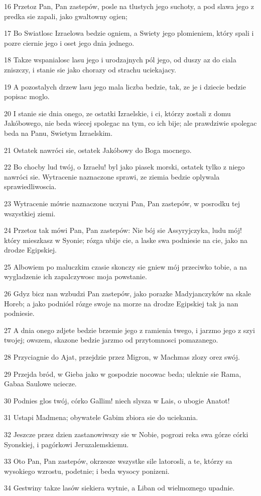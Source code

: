 \par 16 Przetoz Pan, Pan zastepów, posle na tlustych jego suchoty, a pod slawa jego z predka sie zapali, jako gwaltowny ogien;
\par 17 Bo Swiatlosc Izraelowa bedzie ogniem, a Swiety jego plomieniem, który spali i pozre ciernie jego i oset jego dnia jednego.
\par 18 Takze wspanialosc lasu jego i urodzajnych pól jego, od duszy az do ciala zniszczy, i stanie sie jako chorazy od strachu uciekajacy.
\par 19 A pozostalych drzew lasu jego mala liczba bedzie, tak, ze je i dziecie bedzie popisac moglo.
\par 20 I stanie sie dnia onego, ze ostatki Izraelskie, i ci, którzy zostali z domu Jakóbowego, nie beda wiecej spolegac na tym, co ich bije; ale prawdziwie spolegac beda na Panu, Swietym Izraelskim.
\par 21 Ostatek nawróci sie, ostatek Jakóbowy do Boga mocnego.
\par 22 Bo chocby lud twój, o Izraelu! byl jako piasek morski, ostatek tylko z niego nawróci sie. Wytracenie naznaczone sprawi, ze ziemia bedzie oplywala sprawiedliwoscia.
\par 23 Wytracenie mówie naznaczone uczyni Pan, Pan zastepów, w posrodku tej wszystkiej ziemi.
\par 24 Przetoz tak mówi Pan, Pan zastepów: Nie bój sie Assyryjczyka, ludu mój! który mieszkasz w Syonie; rózga ubije cie, a laske swa podniesie na cie, jako na drodze Egipskiej.
\par 25 Albowiem po maluczkim czasie skonczy sie gniew mój przeciwko tobie, a na wygladzenie ich zapalczywosc moja powstanie.
\par 26 Gdyz bicz nan wzbudzi Pan zastepów, jako porazke Madyjanczyków na skale Horeb; a jako podniósl rózge swoje na morze na drodze Egipskiej tak ja nan podniesie.
\par 27 A dnia onego zdjete bedzie brzemie jego z ramienia twego, i jarzmo jego z szyi twojej; owszem, skazone bedzie jarzmo od przytomnosci pomazanego.
\par 28 Przyciagnie do Ajat, przejdzie przez Migron, w Machmas zlozy orez swój.
\par 29 Przejda bród, w Gieba jako w gospodzie nocowac beda; uleknie sie Rama, Gabaa Saulowe uciecze.
\par 30 Podnies glos twój, córko Gallim! niech slysza w Lais, o ubogie Anatot!
\par 31 Ustapi Madmena; obywatele Gabim zbiora sie do uciekania.
\par 32 Jeszcze przez dzien zastanowiwszy sie w Nobie, pogrozi reka swa górze córki Syonskiej, i pagórkowi Jeruzalemskiemu.
\par 33 Oto Pan, Pan zastepów, okrzesze wszystke sile latorosli, a te, którzy sa wysokiego wzrostu, podetnie; i beda wysocy ponizeni.
\par 34 Gestwiny takze lasów siekiera wytnie, a Liban od wielmoznego upadnie.

